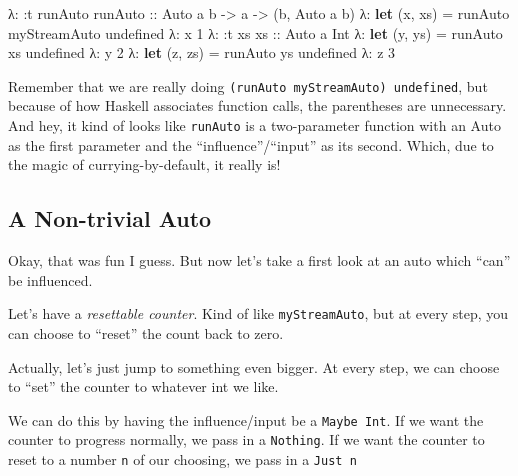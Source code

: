 \documentclass[]{article}
\newenvironment{Shaded}{}{}
\newcommand{\KeywordTok}[1]{\textcolor[rgb]{0.00,0.44,0.13}{\textbf{{#1}}}}
\newcommand{\DataTypeTok}[1]{\textcolor[rgb]{0.56,0.13,0.00}{{#1}}}
\newcommand{\DecValTok}[1]{\textcolor[rgb]{0.25,0.63,0.44}{{#1}}}
\newcommand{\OtherTok}[1]{\textcolor[rgb]{0.00,0.44,0.13}{{#1}}}
\newcommand{\FunctionTok}[1]{\textcolor[rgb]{0.02,0.16,0.49}{{#1}}}
\newcommand{\NormalTok}[1]{{#1}}
\begin{document}
\begin{Shaded}
\begin{Highlighting}[]
\NormalTok{λ}\FunctionTok{:} \FunctionTok{:}\NormalTok{t runAuto}
\OtherTok{runAuto ::} \DataTypeTok{Auto} \NormalTok{a b }\OtherTok{->} \NormalTok{a }\OtherTok{->} \NormalTok{(b, }\DataTypeTok{Auto} \NormalTok{a b)}
\NormalTok{λ}\FunctionTok{:} \KeywordTok{let} \NormalTok{(x, xs) }\FunctionTok{=} \NormalTok{runAuto myStreamAuto undefined}
\NormalTok{λ}\FunctionTok{:} \NormalTok{x}
\DecValTok{1}
\NormalTok{λ}\FunctionTok{:} \FunctionTok{:}\NormalTok{t xs}
\OtherTok{xs ::} \DataTypeTok{Auto} \NormalTok{a }\DataTypeTok{Int}
\NormalTok{λ}\FunctionTok{:} \KeywordTok{let} \NormalTok{(y, ys) }\FunctionTok{=} \NormalTok{runAuto xs undefined}
\NormalTok{λ}\FunctionTok{:} \NormalTok{y}
\DecValTok{2}
\NormalTok{λ}\FunctionTok{:} \KeywordTok{let} \NormalTok{(z, zs) }\FunctionTok{=} \NormalTok{runAuto ys undefined}
\NormalTok{λ}\FunctionTok{:} \NormalTok{z}
\DecValTok{3}
\end{Highlighting}
\end{Shaded}

Remember that we are really doing \texttt{(runAuto\ myStreamAuto)\ undefined}, but because of how
Haskell associates function calls, the parentheses are unnecessary. And hey, it kind of looks like
\texttt{runAuto} is a two-parameter function with an Auto as the first parameter and the
``influence''/``input'' as its second. Which, due to the magic of currying-by-default, it really is!

\subsection{A Non-trivial Auto}\label{a-non-trivial-auto}

Okay, that was fun I guess. But now let's take a first look at an auto which ``can'' be influenced.

Let's have a \emph{resettable counter}. Kind of like \texttt{myStreamAuto}, but at every step, you
can choose to ``reset'' the count back to zero.

Actually, let's just jump to something even bigger. At every step, we can choose to ``set'' the
counter to whatever int we like.

We can do this by having the influence/input be a \texttt{Maybe\ Int}. If we want the counter to
progress normally, we pass in a \texttt{Nothing}. If we want the counter to reset to a number
\texttt{n} of our choosing, we pass in a \texttt{Just\ n}
\end{document}
